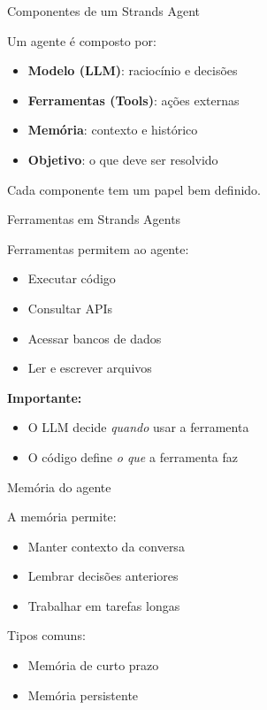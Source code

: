 \documentclass{beamer}
\begin{document}
\begin{frame}{Componentes de um Strands Agent}
    
    Um agente é composto por:
    \begin{itemize}
        \item \textbf{Modelo (LLM)}: raciocínio e decisões
        \item \textbf{Ferramentas (Tools)}: ações externas
        \item \textbf{Memória}: contexto e histórico
        \item \textbf{Objetivo}: o que deve ser resolvido
    \end{itemize}
    
    \vspace{0.3cm}
    
    Cada componente tem um papel bem definido.
    
\end{frame}

\begin{frame}{Ferramentas em Strands Agents}
    
    Ferramentas permitem ao agente:
    \begin{itemize}
        \item Executar código
        \item Consultar APIs
        \item Acessar bancos de dados
        \item Ler e escrever arquivos
    \end{itemize}
    
    \vspace{0.3cm}
    
    \textbf{Importante:}
    \begin{itemize}
        \item O LLM decide \textit{quando} usar a ferramenta
        \item O código define \textit{o que} a ferramenta faz
    \end{itemize}
    
\end{frame}

\begin{frame}{Memória do agente}
    
    A memória permite:
    \begin{itemize}
        \item Manter contexto da conversa
        \item Lembrar decisões anteriores
        \item Trabalhar em tarefas longas
    \end{itemize}
    
    \vspace{0.3cm}
    
    Tipos comuns:
    \begin{itemize}
        \item Memória de curto prazo
        \item Memória persistente
    \end{itemize}
    
\end{frame}
\end{document}
